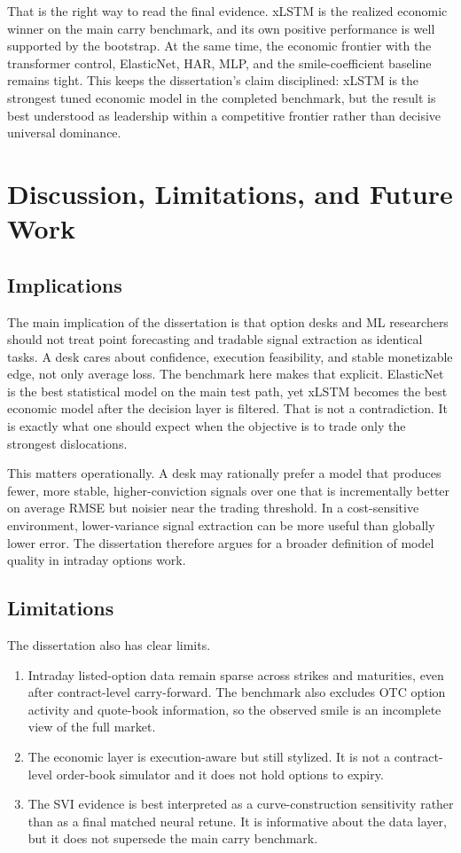 \documentclass[12pt]{report}
\begin{document}
That is the right way to read the final evidence. xLSTM is the realized economic winner on the main carry benchmark, and its own positive performance is well supported by the bootstrap. At the same time, the economic frontier with the transformer control, ElasticNet, HAR, MLP, and the smile-coefficient baseline remains tight. This keeps the dissertation's claim disciplined: xLSTM is the strongest tuned economic model in the completed benchmark, but the result is best understood as leadership within a competitive frontier rather than decisive universal dominance.

\chapter{Discussion, Limitations, and Future Work}

\section{Implications}
The main implication of the dissertation is that option desks and ML researchers should not treat point forecasting and tradable signal extraction as identical tasks. A desk cares about confidence, execution feasibility, and stable monetizable edge, not only average loss. The benchmark here makes that explicit. ElasticNet is the best statistical model on the main test path, yet xLSTM becomes the best economic model after the decision layer is filtered. That is not a contradiction. It is exactly what one should expect when the objective is to trade only the strongest dislocations.

This matters operationally. A desk may rationally prefer a model that produces fewer, more stable, higher-conviction signals over one that is incrementally better on average RMSE but noisier near the trading threshold. In a cost-sensitive environment, lower-variance signal extraction can be more useful than globally lower error. The dissertation therefore argues for a broader definition of model quality in intraday options work.

\section{Limitations}
The dissertation also has clear limits.
\begin{enumerate}[leftmargin=1.3cm]
    \item Intraday listed-option data remain sparse across strikes and maturities, even after contract-level carry-forward. The benchmark also excludes OTC option activity and quote-book information, so the observed smile is an incomplete view of the full market.
    \item The economic layer is execution-aware but still stylized. It is not a contract-level order-book simulator and it does not hold options to expiry.
    \item The SVI evidence is best interpreted as a curve-construction sensitivity rather than as a final matched neural retune. It is informative about the data layer, but it does not supersede the main carry benchmark.
\end{enumerate}
\end{document}
